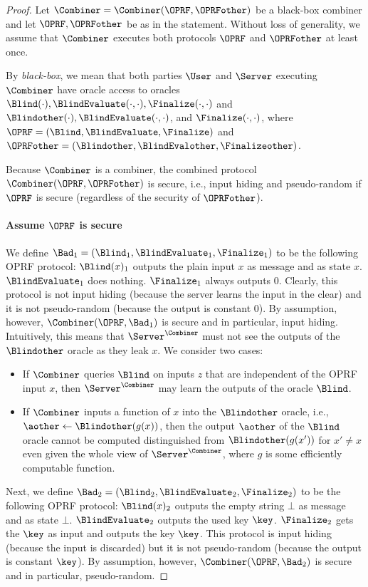 \begin{proof}
 Let $\Combiner=\Combiner(\OPRF,\OPRFother)$ be a black-box combiner and let $\OPRF,\OPRFother$ be as in the statement. Without loss of generality, we assume that $\Combiner$ executes both protocols $\OPRF$ and $\OPRFother$ at least once.

  By \emph{black-box}, we mean that both parties $\User$ and $\Server$ executing $\Combiner$ have oracle access to oracles
  $\Blind(\cdot),\BlindEvaluate(\cdot,\cdot),\Finalize(\cdot,\cdot)$ and $\Blindother(\cdot),\BlindEvaluate(\cdot,\cdot)$, and $\Finalize(\cdot,\cdot)$, where $\OPRF=(\Blind,\BlindEvaluate,\Finalize)$ and $\OPRFother=(\Blindother,\BlindEvalother,\Finalizeother)$.

 Because $\Combiner$ is a combiner, the combined protocol $\Combiner(\OPRF,\OPRFother)$ is secure, i.e.,
 input hiding and pseudo-random if $\OPRF$ is secure (regardless of the security of $\OPRFother$).

 \paragraph{Assume $\OPRF$ is secure}
 We define $\Bad_1=(\Blind_1,\BlindEvaluate_1,\Finalize_1)$ to be the following OPRF protocol:
 $\Blind(x)_1$ outputs the plain input $x$ as message and as state $x$. $\BlindEvaluate_1$ does nothing.
 $\Finalize_1$ always outputs $0$. Clearly, this protocol is not input hiding (because the server learns the input in the clear) and it is not pseudo-random (because the output is constant 0).
 By assumption, however, $\Combiner(\OPRF,\Bad_1)$ is secure and in particular, input hiding.
 Intuitively, this means that $\Server^\Combiner$ must not see the outputs of the $\Blindother$ oracle as they leak $x$.
 We consider two cases:
 \begin{itemize}
    \item If $\Combiner$ queries $\Blind$ on inputs $z$ that are independent of the OPRF input $x$, then $\Server^\Combiner$ may learn the outputs of the oracle $\Blind$.
    \item If $\Combiner$ inputs a function of $x$ into the $\Blindother$ oracle, i.e., $\aother\gets\Blindother(g(x))$, then the output $\aother$ of the $\Blind$ oracle cannot be computed distinguished from $\Blindother(g(x'))$ for $x'\neq x$ even given the whole view of $\Server^\Combiner$, where $g$ is some efficiently computable function.
 \end{itemize}

 Next, we define $\Bad_2=(\Blind_2,\BlindEvaluate_2,\Finalize_2)$ to be the following OPRF protocol:
 $\Blind(x)_2$ outputs the empty string $\bot$ as message and as state $\bot$. $\BlindEvaluate_2$ outputs the used key $\key$.
 $\Finalize_2$ gets the $\key$ as input and outputs the key $\key$. This protocol is input hiding (because the input is discarded) but it is not pseudo-random (because the output is constant $\key$).
 By assumption, however, $\Combiner(\OPRF,\Bad_2)$ is secure and in particular, pseudo-random.




\end{proof}


